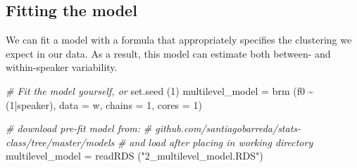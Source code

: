 \documentclass[
]{book}
\newenvironment{Shaded}{\begin{snugshade}}{\end{snugshade}}
\newcommand{\AttributeTok}[1]{\textcolor[rgb]{0.77,0.63,0.00}{#1}}
\newcommand{\CommentTok}[1]{\textcolor[rgb]{0.56,0.35,0.01}{\textit{#1}}}
\newcommand{\DecValTok}[1]{\textcolor[rgb]{0.00,0.00,0.81}{#1}}
\newcommand{\FunctionTok}[1]{\textcolor[rgb]{0.00,0.00,0.00}{#1}}
\newcommand{\NormalTok}[1]{#1}
\newcommand{\OtherTok}[1]{\textcolor[rgb]{0.56,0.35,0.01}{#1}}
\newcommand{\SpecialCharTok}[1]{\textcolor[rgb]{0.00,0.00,0.00}{#1}}
\newcommand{\StringTok}[1]{\textcolor[rgb]{0.31,0.60,0.02}{#1}}
\begin{document}
\hypertarget{fitting-the-model}{%
\subsection{Fitting the model}\label{fitting-the-model}}

We can fit a model with a formula that appropriately specifies the clustering we expect in our data. As a result, this model can estimate both between- and within-speaker variability.

\begin{Shaded}
\begin{Highlighting}[]
\CommentTok{\# Fit the model yourself, or}
\FunctionTok{set.seed}\NormalTok{ (}\DecValTok{1}\NormalTok{)}
\NormalTok{multilevel\_model }\OtherTok{=}  
  \FunctionTok{brm}\NormalTok{ (f0 }\SpecialCharTok{\textasciitilde{}}\NormalTok{ (}\DecValTok{1}\SpecialCharTok{|}\NormalTok{speaker), }\AttributeTok{data =}\NormalTok{ w, }\AttributeTok{chains =} \DecValTok{1}\NormalTok{, }\AttributeTok{cores =} \DecValTok{1}\NormalTok{)}

\CommentTok{\# download pre{-}fit model from: }
\CommentTok{\# github.com/santiagobarreda/stats{-}class/tree/master/models}
\CommentTok{\# and load after placing in working directory}
\NormalTok{multilevel\_model }\OtherTok{=} \FunctionTok{readRDS}\NormalTok{ (}\StringTok{"2\_multilevel\_model.RDS"}\NormalTok{)}
\end{Highlighting}
\end{Shaded}
\end{document}
